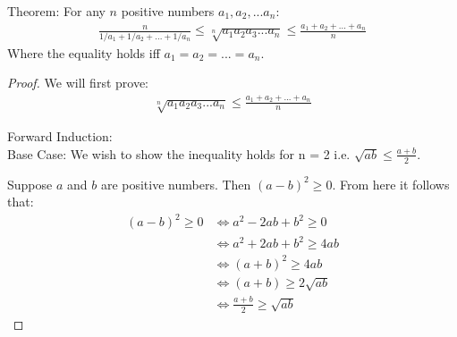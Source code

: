 \documentclass{article}
\begin{document}
Theorem: For any $n$ positive numbers $a_1, a_2, ... a_n$: 
\begin{align*}
\frac{n}{1/a_1 + 1/a_2 + ... + 1/a_n} \leq \sqrt[n]{a_1 a_2 a_3 ... a_n} \leq \frac{a_1 + a_2 + ... + a_n}{n}
\end{align*}
Where the equality holds iff $a_1 = a_2 = ... = a_n$.

\begin{proof}
We will first prove:
\begin{align*}
\sqrt[n]{a_1 a_2 a_3 ... a_n} \leq \frac{a_1 + a_2 + ... + a_n}{n}
\end{align*}

Forward Induction: \\
Base Case: We wish to show the inequality holds for n = 2 i.e. $\sqrt{ab} \leq \frac{a+b}{2}$. 

Suppose $a$ and $b$ are positive numbers. Then $(a-b)^2 \geq 0$. From here it follows that:
\begin{align*}
(a-b)^2 \geq 0 &\iff a^2 - 2ab + b^2 \geq 0 \\
			   &\iff a^2 + 2ab + b^2 \geq 4ab \\
			   &\iff (a+b)^2 \geq 4ab \\
			   &\iff (a+b) \geq 2\sqrt{ab} \\
			   &\iff \frac{a+b}{2} \geq \sqrt{ab}
\end{align*}



\end{proof}
\end{document}
